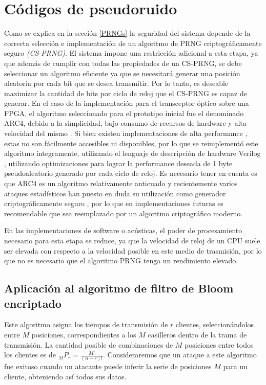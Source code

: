 \section{Códigos de pseudoruido}
Como se explica en la sección \ref{PRNGs} la seguridad del sistema depende de la correcta selección e implementación de un algoritmo de PRNG criptográficamente seguro \textit{(CS-PRNG)}.
El sistema impone una restricción adicional a esta etapa, ya que además de cumplir con todas las propiedades de un CS-PRNG, se debe seleccionar un algoritmo eficiente ya que se necesitará generar una posición aleatoria por cada bit que se desea transmitir. Por lo tanto, es deseable maximizar la cantidad de bits por ciclo de reloj que el CS-PRNG es capaz de generar.
En el caso de la implementación para el transceptor óptico sobre una FPGA, el algoritmo seleccionado para el prototipo inicial fue el denominado ARC4, debido a la simplicidad, bajo consumo de recursos de hardware y alta velocidad del mismo  \cite{Menezes:1996:HAC:548089}. Si bien existen implementaciones de alta performance \cite{10.1109/TC.2012.19}, estas no son fácilmente accesibles ni disponibles, por lo que se reimplementó este algoritmo íntegramente, utilizando el lenguaje de descripción de hardware Verilog \cite{thomas2002verilog}, utilizando optimizaciones para lograr la performance deseada de 1 byte pseudoaleatorio generado por cada ciclo de reloj. Es necesario tener en cuenta es que ARC4 es un algoritmo relativamente anticuado y recientemente varios ataques estadísticos han puesto en duda su utilización como generador criptográficamente seguro \cite{Sepehrdad:2011:SAR:2008684.2008712}, por lo que en implementaciones futuras es recomendable que sea reemplazado por un algoritmo criptográfico moderno.

En las implementaciones de software o acústicas, el poder de procesamiento necesario para esta etapa se reduce, ya que la velocidad de reloj de un CPU suele ser elevada con respecto a la velocidad posible en este medio de trasmisión, por lo que no es necesario que el algoritmo PRNG tenga un rendimiento elevado.


\subsection{Aplicación al algoritmo de filtro de Bloom encriptado}

Este algoritmo asigna los tiempos de transmisión de $r$ clientes, seleccionándolos entre $M$ posiciones, correspondientes a los $M$ casilleros dentro de la trama de transmisión.
La cantidad posible de combinaciones de $M$ posiciones entre todos los clientes es de $ _{M}P_{r} = \frac{M!}{(n-r)!} $.
Consideraremos que un ataque a este algoritmo fue exitoso cuando un atacante puede inferir la serie de posiciones $M$ para un cliente, obteniendo así todos sus datos.

